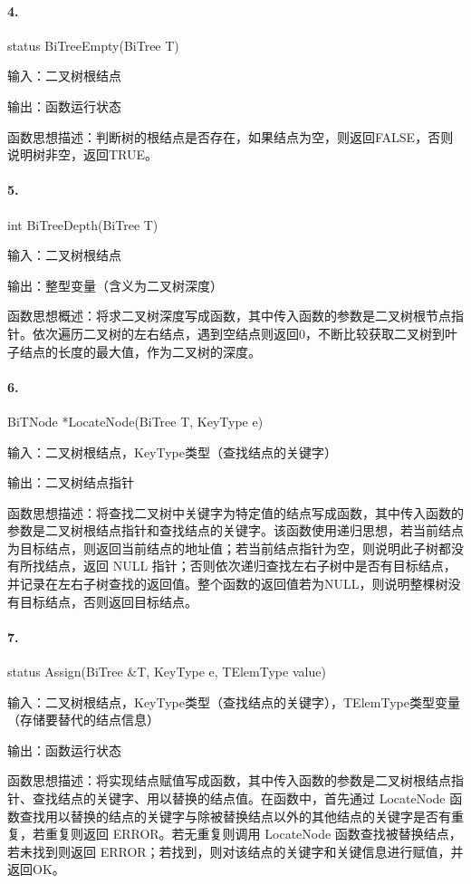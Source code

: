 \documentclass[supercite]{Experimental_Report}
\theoremstyle{definition}
\begin{document}
\paragraph{ 4.}status BiTreeEmpty(BiTree T)

输入：二叉树根结点

输出：函数运行状态

函数思想描述：判断树的根结点是否存在，如果结点为空，则返回FALSE，否则说明树非空，返回TRUE。

\paragraph{ 5.}int BiTreeDepth(BiTree T)

输入：二叉树根结点

输出：整型变量（含义为二叉树深度）

函数思想概述：将求二叉树深度写成函数，其中传入函数的参数是二叉树根节点指针。依次遍历二叉树的左右结点，遇到空结点则返回0，不断比较获取二叉树到叶子结点的长度的最大值，作为二叉树的深度。

\paragraph{ 6.}BiTNode *LocateNode(BiTree T, KeyType e)

输入：二叉树根结点，KeyType类型（查找结点的关键字）

输出：二叉树结点指针

函数思想描述：将查找二叉树中关键字为特定值的结点写成函数，其中传入函数的参数是二叉树根结点指针和查找结点的关键字。该函数使用递归思想，若当前结点为目标结点，则返回当前结点的地址值；若当前结点指针为空，则说明此子树都没有所找结点，返回 NULL 指针；否则依次递归查找左右子树中是否有目标结点，并记录在左右子树查找的返回值。整个函数的返回值若为NULL，则说明整棵树没有目标结点，否则返回目标结点。

\paragraph{ 7.}status Assign(BiTree \&T, KeyType e, TElemType value)

输入：二叉树根结点，KeyType类型（查找结点的关键字），TElemType类型变量（存储要替代的结点信息）

输出：函数运行状态

函数思想描述：将实现结点赋值写成函数，其中传入函数的参数是二叉树根结点指针、查找结点的关键字、用以替换的结点值。在函数中，首先通过 LocateNode 函数查找用以替换的结点的关键字与除被替换结点以外的其他结点的关键字是否有重复，若重复则返回 ERROR。若无重复则调用 LocateNode 函数查找被替换结点，若未找到则返回 ERROR；若找到，则对该结点的关键字和关键信息进行赋值，并返回OK。
\end{document}
